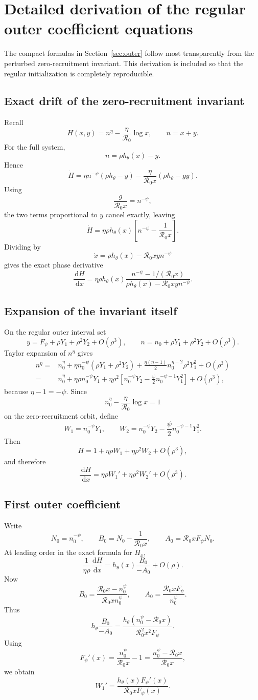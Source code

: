 \documentclass[11pt]{article}
\newcommand{\Rzero}{\mathcal R_0}
\newcommand{\hth}{h_\theta}
\newcommand{\Fpsi}{F_\psi}
\newcommand{\dd}{\,\mathrm{d}}
\begin{document}
\section{Detailed derivation of the regular outer coefficient equations}
\label{sec:outerdetail}

The compact formulas in Section~\ref{sec:outer} follow most transparently from the perturbed zero-recruitment invariant. This derivation is included so that the regular initialization is completely reproducible.

\subsection{Exact drift of the zero-recruitment invariant}
Recall
\[
H(x,y)=n^\eta-\frac\eta{\Rzero}\log x,
\qquad n=x+y.
\]
For the full system,
\[
\dot n=\rho\hth(x)-y.
\]
Hence
\[
\dot H
=\eta n^{-\psi}(\rho\hth-y)
-\frac\eta{\Rzero x}(\rho\hth-gy).
\]
Using
\[
\frac{g}{\Rzero x}=n^{-\psi},
\]
the two terms proportional to $y$ cancel exactly, leaving
\[
\boxed{
\dot H
=\eta\rho\hth(x)
\left[n^{-\psi}-\frac1{\Rzero x}\right].
}
\]
Dividing by
\[
\dot x=\rho\hth(x)-\Rzero xy n^{-\psi}
\]
gives the exact phase derivative
\[
\boxed{
\frac{\dd H}{\dd x}
=
\eta\rho\hth(x)
\frac{n^{-\psi}-1/(\Rzero x)}
{\rho\hth(x)-\Rzero xy n^{-\psi}}.
}
\]

\subsection{Expansion of the invariant itself}
On the regular outer interval set
\[
y=\Fpsi+\rho Y_1+\rho^2Y_2+O(\rho^3),
\qquad
n=n_0+\rho Y_1+\rho^2Y_2+O(\rho^3).
\]
Taylor expansion of $n^\eta$ gives
\[
\begin{aligned}
n^\eta
={}&n_0^\eta
+\eta n_0^{-\psi}(\rho Y_1+\rho^2Y_2)
+\frac{\eta(\eta-1)}2n_0^{\eta-2}\rho^2Y_1^2
+O(\rho^3)\\
={}&n_0^\eta
+\eta\rho n_0^{-\psi}Y_1
+\eta\rho^2
\left[n_0^{-\psi}Y_2-\frac\psi2n_0^{-\psi-1}Y_1^2\right]
+O(\rho^3),
\end{aligned}
\]
because $\eta-1=-\psi$. Since
\[
n_0^\eta-\frac\eta{\Rzero}\log x=1
\]
on the zero-recruitment orbit, define
\[
W_1=n_0^{-\psi}Y_1,
\qquad
W_2=n_0^{-\psi}Y_2-\frac\psi2n_0^{-\psi-1}Y_1^2.
\]
Then
\[
\boxed{
H=1+\eta\rho W_1+\eta\rho^2W_2+O(\rho^3),
}
\]
and therefore
\[
\frac{\dd H}{\dd x}
=\eta\rho W_1'+\eta\rho^2W_2'+O(\rho^3).
\]

\subsection{First outer coefficient}
Write
\[
N_0=n_0^{-\psi},
\qquad
B_0=N_0-\frac1{\Rzero x},
\qquad
A_0=\Rzero x\Fpsi N_0.
\]
At leading order in the exact formula for $H_x$,
\[
\frac1{\eta\rho}\frac{\dd H}{\dd x}
=\hth(x)\frac{B_0}{-A_0}+O(\rho).
\]
Now
\[
B_0
=\frac{\Rzero x-n_0^\psi}{\Rzero x n_0^\psi},
\qquad
A_0=\frac{\Rzero x\Fpsi}{n_0^\psi}.
\]
Thus
\[
\hth\frac{B_0}{-A_0}
=
\frac{\hth(n_0^\psi-\Rzero x)}{\Rzero^2x^2\Fpsi}.
\]
Using
\[
\Fpsi'(x)=\frac{n_0^\psi}{\Rzero x}-1
=\frac{n_0^\psi-\Rzero x}{\Rzero x},
\]
we obtain
\[
\boxed{
W_1'
=\frac{\hth(x)\Fpsi'(x)}{\Rzero x\Fpsi(x)}.
}
\]
\end{document}
